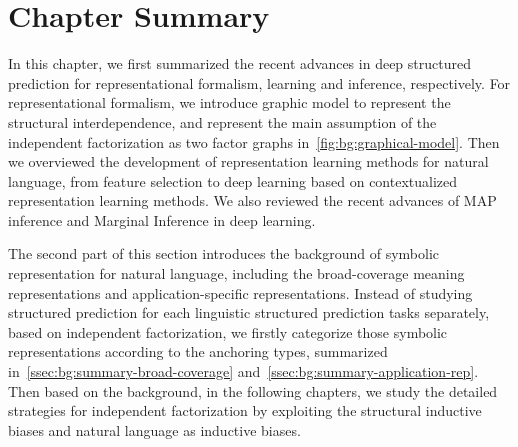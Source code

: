 \section{Chapter Summary}
\label{sec:bg:summary}
In this chapter, we first summarized the recent advances in deep
structured prediction for representational formalism,
learning and inference, respectively. For representational formalism,
we introduce graphic model to represent the structural
interdependence, and represent the main assumption of the independent
factorization as two factor graphs
in~\autoref{fig:bg:graphical-model}. Then we overviewed the
development of representation learning methods for natural language,
from feature selection to deep learning based on contextualized
representation learning methods. We also reviewed the recent advances
of MAP inference and Marginal Inference in deep learning.

The second part of this section introduces the background of symbolic
representation for natural language, including the broad-coverage
meaning representations and application-specific
representations. Instead of studying structured prediction for each
linguistic structured prediction tasks separately, based on
independent factorization, we firstly categorize those symbolic
representations according to the anchoring types, summarized
in~\autoref{ssec:bg:summary-broad-coverage}
and~\autoref{ssec:bg:summary-application-rep}. Then based on the
background, in the following chapters, we study the detailed
strategies for independent factorization by exploiting the structural
inductive biases and natural language as inductive biases.

